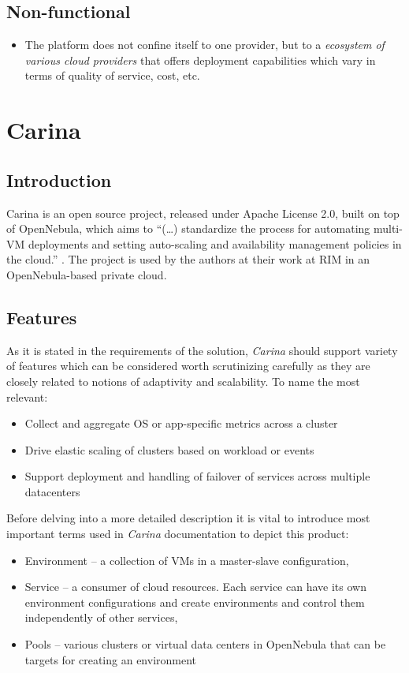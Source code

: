 \subsection{Non-functional}
\begin{itemize}
  \item The platform does not confine itself to one provider, but to a \emph{ecosystem of various cloud providers} that offers deployment capabilities which vary in terms of quality of service, cost, etc.
\end{itemize}
	
\section{Carina}

\subsection{Introduction}
Carina is an open source project, released under Apache License 2.0, built on top of OpenNebula, which aims to ``(\ldots) standardize the process for automating multi-VM deployments and setting auto-scaling and availability management policies in the cloud.'' \cite{CarinaBlog}. The project is used by the authors at their work at RIM in an OpenNebula-based private cloud.

\subsection{Features}
As it is stated in the requirements of the solution, \emph{Carina} should support variety of features which can be considered worth scrutinizing carefully as they are closely related to notions of adaptivity and scalability. To name the most relevant: \cite{CarinaBlog}
\begin{itemize}
  \item Collect and aggregate OS or app-specific metrics across a cluster
  \item Drive elastic scaling of clusters based on workload or events
  \item Support deployment and handling of failover of services across multiple datacenters
\end{itemize}

Before delving into a more detailed description it is vital to introduce most important terms used in \emph{Carina} documentation to depict this product:
\begin{itemize}
  \item Environment -- a collection of VMs in a master-slave configuration,
  \item Service -- a consumer of cloud resources. Each service can have its own environment configurations and create environments and control them independently of other services,
  \item Pools -- various clusters or virtual data centers in OpenNebula that can be targets for creating an environment
\end{itemize}

